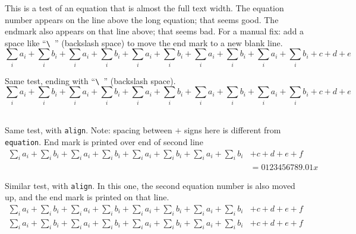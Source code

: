 \begin{test}
  This is a test of an equation that is almost the full text width.
  The equation number appears on the line above the long equation; that seems good.
  The endmark also appears on that line above; that seems bad.
  For a manual fix: add a space like ``\verb|\ |'' (backslash space) to move the end mark to a new blank line.
  \begin{equation}
    \sum_i a_i + \sum_i b_i
    + \sum_i a_i + \sum_i b_i
    + \sum_i a_i + \sum_i b_i
    + \sum_i a_i + \sum_i b_i
    + \sum_i a_i + \sum_i b_i
    + c + d + e
  \end{equation}%
\end{test}
\begin{test}
  Same test, ending with ``\verb|\ |'' (backslash space).
  \begin{equation}
    \sum_i a_i + \sum_i b_i
    + \sum_i a_i + \sum_i b_i
    + \sum_i a_i + \sum_i b_i
    + \sum_i a_i + \sum_i b_i
    + \sum_i a_i + \sum_i b_i
    + c + d + e
  \end{equation}\ %
\end{test}

\begin{test}
  Same test, with \texttt{align}.
  Note: spacing between $+$ signs here is different from \texttt{equation}.
  End mark is printed over end of second line
  \begin{align}
    \sum_i a_i + \sum_i b_i
    + \sum_i a_i + \sum_i b_i
    + \sum_i a_i + \sum_i b_i
    + \sum_i a_i + \sum_i b_i
    & + c + d + e + f \\
    & = 0123456789.01x
  \end{align}%
\end{test}
\begin{test}
  Similar test, with \texttt{align}.
  In this one, the second equation number is also moved up, and the end mark is printed on that line.
  \begin{align}
    \sum_i a_i + \sum_i b_i
    + \sum_i a_i + \sum_i b_i
    + \sum_i a_i + \sum_i b_i
    + \sum_i a_i + \sum_i b_i
    & + c + d + e + f\\
    \sum_i a_i + \sum_i b_i
    + \sum_i a_i + \sum_i b_i
    + \sum_i a_i + \sum_i b_i
    + \sum_i a_i + \sum_i b_i
    & + c + d + e + f
  \end{align}%
\end{test}

